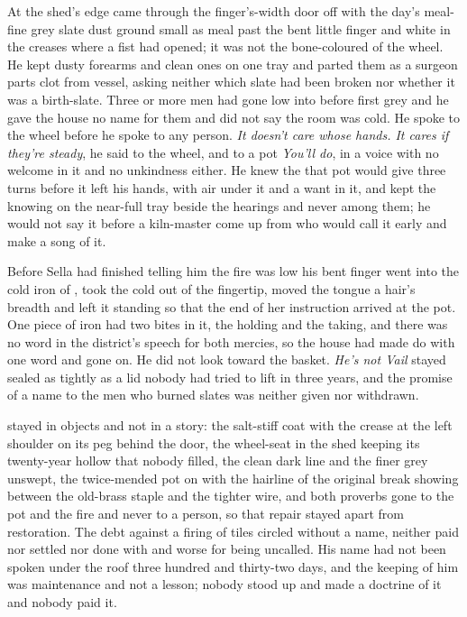 At the shed's edge  came through the finger's-width door off  with the day's meal-fine grey slate dust ground small as meal past the bent little finger and white in the creases where a fist had opened; it was not the bone-coloured  of the wheel. He kept dusty forearms and clean ones on one tray and parted them as a surgeon parts clot from vessel, asking neither which slate had been broken nor whether it was a birth-slate. Three or more men had gone low into  before first grey and he gave the house no name for them and did not say the room was cold. He spoke to the wheel before he spoke to any person. \emph{It doesn't care whose hands. It cares if they're steady}, he said to the wheel, and to a pot \emph{You'll do}, in a voice with no welcome in it and no unkindness either. He knew the  that pot would give three turns before it left his hands, with air under it and a want in it, and kept the knowing on the near-full tray beside the hearings and never among them; he would not say it before a kiln-master come up from  who would call it early and make a song of it.

Before Sella had finished telling him the fire was low his bent finger went into the cold iron of , took the cold out of the fingertip, moved the tongue a hair's breadth and left it standing so that the end of her instruction arrived at the pot. One piece of iron had two bites in it, the holding and the taking, and there was no word in the district's speech for both mercies, so the house had made do with one word and gone on. He did not look toward the basket. \emph{He's not Vail} stayed sealed as tightly as a lid nobody had tried to lift in three years, and the promise of a name to the men who burned slates was neither given nor withdrawn.

 stayed in objects and not in a story: the salt-stiff coat with the crease at the left shoulder on its peg behind the door, the wheel-seat in the shed keeping its twenty-year hollow that nobody filled, the clean dark line and the finer grey unswept, the twice-mended pot on  with the hairline of the original break showing between the old-brass staple and the tighter wire, and both proverbs gone to the pot and the fire and never to a person, so that repair stayed apart from restoration. The debt against a firing of tiles circled without a name, neither paid nor settled nor done with and worse for being uncalled. His name had not been spoken under the roof three hundred and thirty-two days, and the keeping of him was maintenance and not a lesson; nobody stood up and made a doctrine of it and nobody paid it.

